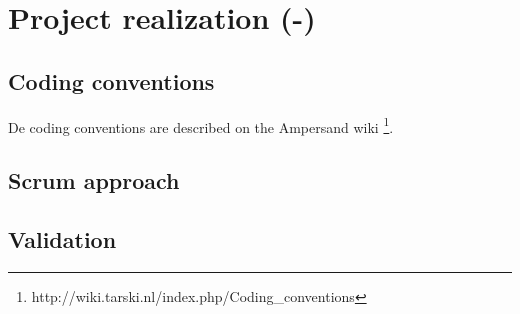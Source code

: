 \section{Project realization (-)}
\label{sec:project-realization}
\subsection{Coding conventions}
De coding conventions are described on the Ampersand wiki \footnote{http://wiki.tarski.nl/index.php/Coding\_conventions}.

\subsection{Scrum approach}
\lipsum[1]
\subsection{Validation}
\lipsum[1]